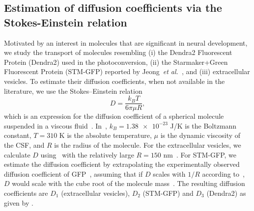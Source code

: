 \documentclass{WileyMSP-template}
\begin{document}
\subsection{Estimation of diffusion coefficients via the Stokes-Einstein relation}
Motivated by an interest in molecules that are significant in neural development,
we study the transport of molecules resembling (i) the Dendra2 Fluorescent Protein (Dendra2)
used in the photoconversion, (ii) the Starmaker+Green Fluorescent Protein (STM-GFP) reported by
Jeong~\emph{et al.}~\cite{Jeong2024TheZebrafish}, and (iii) extracellular vesicles.
To estimate their diffusion coefficients, when not
available in the literature, we use the Stokes--Einstein relation
\begin{equation}
    D = \frac{k_B T}{6\pi \mu R},
    \label{eq:D_stokes_einstein}
\end{equation}
which is an expression for the diffusion coefficient of a spherical
molecule suspended in a viscous fluid~\cite{Einstein1905UberTeilchen}.
In~, $k_B = \num{1.38e-23}$ J/K is the Boltzmann constant,
$T = 310$ K is the absolute temperature, $\mu$ is the dynamic viscosity of the
CSF, and $R$ is the radius of the molecule.
For the extracellular vesicles, we calculate $D$ using~
with the relatively large $R=150$ nm~\cite{Moghassemi2024ExtracellularDecade}.
For STM-GFP, we estimate the diffusion coefficient by extrapolating
the experimentally observed diffusion coefficient of
GFP~\cite{Swaminathan1997PhotobleachingDiffusion, Potma2001ReducedCells},
assuming that if $D$ scales with $1/R$ according to~,
$D$ would scale with the cube root of the molecule mass~\cite{Goodhill1997DiffusionGuidance}.
The resulting diffusion coefficients
are $D_1$ (extracellular vesicles), $D_2$ (STM-GFP) and $D_3$ (Dendra2) as given by .
\end{document}
